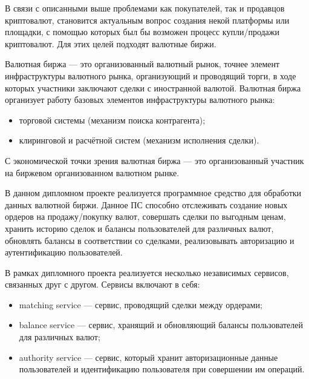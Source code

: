 В связи с описанными выше проблемами как покупателей, так и продавцов криптовалют, становится актуальным вопрос создания некой платформы или площадки, с помощью которых был бы возможен процесс купли/продажи криптовалют. Для этих целей подходят валютные биржи.

Валютная биржа\cite{wiki_exchange} — это организованный валютный рынок, точнее элемент инфраструктуры валютного рынка, организующий и проводящий торги, в ходе которых участники заключают сделки с иностранной валютой. Валютная биржа организует работу базовых элементов инфраструктуры валютного рынка:
\begin{itemize}
    \item торговой системы (механизм поиска контрагента);
    \item клиринговой и расчётной систем (механизм исполнения сделки).
\end{itemize}
С экономической точки зрения валютная биржа — это организованный участник на биржевом организованном валютном рынке.

В данном дипломном проекте реализуется программное средство для обработки данных валютной биржи. Данное ПС способно отслеживать создание новых ордеров на продажу/покупку валют, совершать сделки по выгодным ценам, хранить историю сделок и балансы пользователей для различных валют, обновлять балансы в соответствии со сделками, реализовывать авторизацию и аутентификацию пользователей.

В рамках дипломного проекта реализуется несколько независимых сервисов, связанных друг с другом. Сервисы включают в себя:
\begin{itemize}
    \item matching service — сервис, проводящий сделки между ордерами;
    \item balance service — сервис, хранящий и обновляющий балансы пользователей для различных валют;
    \item authority service — сервис, который хранит авторизационные данные пользователей и идентификацию пользователя при совершении им операций.
\end{itemize}

